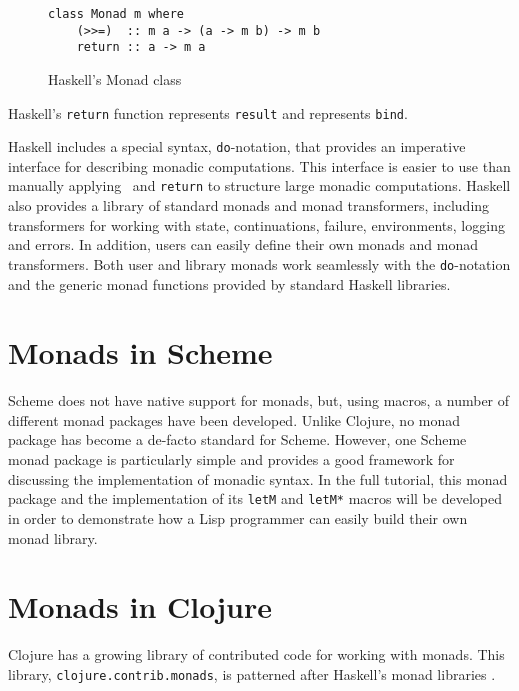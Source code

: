 \documentclass[natbib,10pt]{sigplanconf}
\begin{document}
\begin{figure}
\begin{center}
\begin{verbatim}
class Monad m where
    (>>=)  :: m a -> (a -> m b) -> m b
    return :: a -> m a
\end{verbatim}
\end{center}
\caption{Haskell's Monad class}
\label{fig-Haskell-Monad-class}
\end{figure}

Haskell's {\tt return} function represents \texttt{result} and
\hbind \linebreak represents \texttt{bind}.

Haskell includes a special syntax, {\tt do}-notation, that provides
an imperative interface for describing monadic computations. This 
interface is easier to use than manually applying \hbind \ and {\tt return}
to structure large monadic computations. Haskell also provides a
library of standard monads and monad transformers, including
transformers for working with state, continuations, failure,
environments, logging and errors.  In addition, users can easily
define their own monads and monad transformers. Both user and
library monads work seamlessly with the {\tt do}-notation and
the generic monad functions provided by standard Haskell 
libraries.

\section{Monads in Scheme}

Scheme does not have native support for monads, but, using macros,
a number of different monad packages have been developed. Unlike 
Clojure, no monad package has become a de-facto
standard for Scheme. However, one Scheme monad package \citep{scheme-monads} 
is particularly simple and provides a good framework for discussing 
the implementation of monadic syntax. In the full tutorial, this monad 
package and the implementation of its {\tt letM} and {\tt letM*} macros
will be developed in order to demonstrate how a Lisp programmer can easily 
build their own monad library.

\section{Monads in Clojure}

Clojure has a growing library of contributed code for working with
monads. This library, {\tt clojure.contrib.monads}, is patterned after 
Haskell's monad libraries \citep{clojure-monads1, clojure-monads2}.
\end{document}
